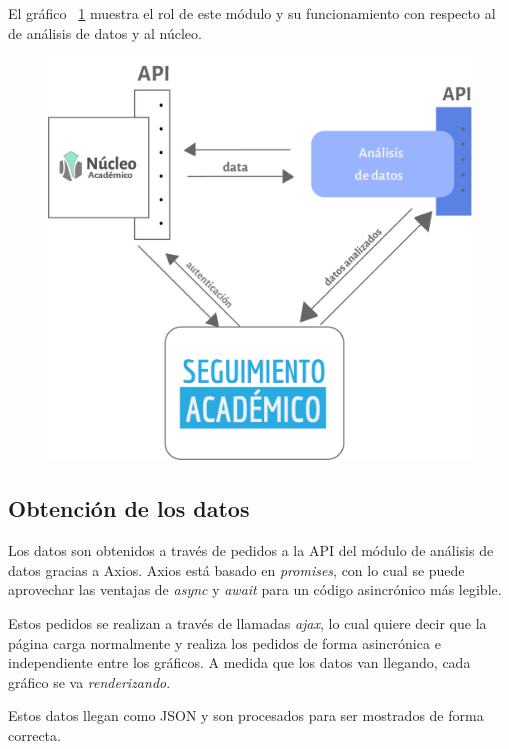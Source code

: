 El gráfico ~\ref{fig:analisis-datos} muestra el rol de este módulo y su funcionamiento con respecto al de análisis de datos y al núcleo.

\begin{figure}[H]
  \centering
    \includegraphics[scale=0.8]{images/seguimiento-academico/flow-seguimiento-academico.png}
  \label{fig:analisis-datos}
\end{figure}

\subsection{Obtención de los datos}

Los datos son obtenidos a través de pedidos a la API del módulo de análisis de datos gracias a Axios.
Axios está basado en \textit{promises}, con lo cual se puede aprovechar las ventajas de \textit{async} y \textit{await} para un código asincrónico más legible.

Estos pedidos se realizan a través de llamadas \textit{ajax}, lo cual quiere decir que la página carga normalmente y realiza los pedidos de forma asincrónica e independiente entre los gráficos. A medida que los datos van llegando, cada gráfico se va \textit{renderizando}.

Estos datos llegan como JSON y son procesados para ser mostrados de forma correcta.


